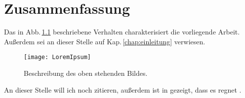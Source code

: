 \graphicspath{{grafiken/}}

\chapter{Zusammenfassung}

Das in Abb.\,\ref{fig:LoremIpsum} beschriebene Verhalten charakterisiert die vorliegende Arbeit. Au\ss erdem sei an dieser Stelle auf Kap.\,\ref{chap:einleitung} verwiesen.

\begin{figure}[htbp]
\centering
\texttt{[image: LoremIpsum]}
\caption{Beschreibung des oben stehenden Bildes.}
\label{fig:LoremIpsum}
\end{figure}

An dieser Stelle will ich noch \cite{sahin:penning} zitieren, au\ss erdem ist in \cite{zibell:diplarbeit} gezeigt, dass es regnet \cite{zibell:phd}.

